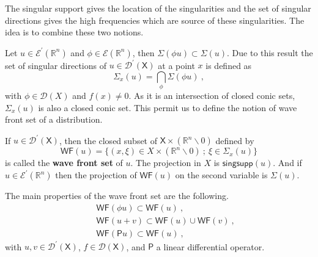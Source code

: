 \documentclass[10pt]{book}
\newcommand{\WF}{\mathsf{WF}}
\newcommand{\Dcal}{\mathcal{D}}
\newcommand{\Ecal}{\mathcal{E}}
\newcommand{\Rbb}{\mathbb{R}}
\newcommand{\Psf}{\mathsf{P}}
\newcommand{\Xsf}{\mathsf{X}}
\theoremstyle{break}
\begin{document}
\bigskip


The singular support gives the location of the singularities and the set of singular directions gives the high frequencies which are source of these singularities. The idea is to combine these two notions.


\bigskip

Let $u \in \Ecal^\prime(\Rbb^n)$ and $\phi \in \Ecal(\Rbb^n)$, then $\Sigma(\phi u) \subset \Sigma(u)$. Due to this result the set of singular directions of $u\in\Dcal^\prime(\Xsf)$ at a point $x$ is defined as
%
\begin{equation*}
\Sigma_x(u) = \underset{\phi}{\bigcap} \Sigma(\phi u) \ , 
\end{equation*}
%
with $\phi \in \Dcal(X)$ and $f(x) \neq 0$. As it is an intersection of closed conic sets, $\Sigma_x(u)$ is also a closed conic set. This permit us to define the notion of wave front set of a distribution. 


\bigskip


If $u \in \Dcal^\prime(\Xsf)$, then the closed subset of $\Xsf \times (\Rbb^n \backslash 0)$ defined by
%
\begin{equation*}
\WF(u) = \bigg\{ (x,\xi) \in X \times (\Rbb^n \backslash 0) \ ; \ \xi \in \Sigma_x(u) \bigg\}
\end{equation*}
is called the \textbf{wave front set} of $u$. The projection in $X$ is $\mathsf{singsupp}(u)$. And if $u \in \Ecal^\prime(\Rbb^n)$ then the projection of $\WF(u)$ on the second variable is $\Sigma(u)$. 


\bigskip

The main properties of the wave front set are the following. 
%
\begin{eqnarray*}
&& \WF(\phi u) \subset \WF(u) \ ,\\
&& \WF(u+v) \subset \WF(u) \cup \WF(v) \ ,  \\
&& \WF(\Psf u) \subset \WF(u) \ ,
\end{eqnarray*}
%
with $u,v \in \Dcal^\prime(\Xsf)$, $f\in\Dcal(\Xsf)$, and $\Psf$ a linear differential operator. 


\bigskip
\end{document}
